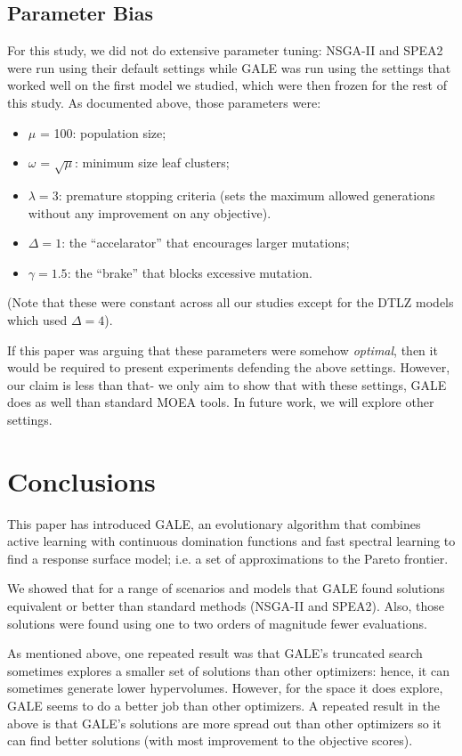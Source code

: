 \documentclass[10pt,journal,compsoc]{IEEEtran}
\newcommand{\bi}{\begin{itemize}}
\newcommand{\ei}{\end{itemize}}
\newenvironment{changed}{\par}{\par}
\begin{document}
\subsection{Parameter Bias}
For this study, we did not do extensive parameter tuning:
NSGA-II and SPEA2 were run using their default settings
while GALE was run using the settings that worked well on the first model we
studied, which were then frozen for the
rest of this study. As documented above, those parameters were:
\bi
\item $\mu$ = 100:  population size;
\item $\omega$ = $\sqrt{\mu}$: minimum size leaf clusters;
\item $\lambda = 3$: premature stopping criteria (sets the
maximum allowed 
generations without
any improvement on any objective).
\item   $\Delta=1$: the ``accelarator'' that encourages larger mutations;
\item  $\gamma=1.5$: the ``brake'' that blocks excessive mutation.
\ei
(Note that these were constant across all our studies except for the DTLZ models which used
$\Delta=4$).

If this paper was arguing that these parameters were somehow {\em optimal},
then it would be required to present experiments defending the above settings.
However, our  claim is less than that- we only aim  to show
that with these settings, GALE does as well than standard
MOEA tools. In future work, we will explore other  settings.



   
\section{Conclusions}
This paper has introduced GALE, an evolutionary
algorithm that combines active learning with
continuous domination functions and fast spectral
learning to find a response surface model; i.e. a
set of approximations to the Pareto frontier.


We showed that for a range of scenarios and models
that GALE found solutions equivalent or better than
standard methods (NSGA-II and SPEA2).  Also, those
solutions were found using one to two orders of
magnitude fewer evaluations.

\begin{changed}
As mentioned above, one repeated result was
that
GALE's truncated search sometimes explores a
smaller set of solutions than other
optimizers: hence, it can sometimes generate lower hypervolumes.
However, for the space it does explore,
GALE seems to do a better job than other optimizers.
A repeated result in the above is that GALE's solutions are more spread out
than other optimizers so 
 it 
can find better solutions (with most improvement to the objective scores).
\end{changed}
\end{document}
